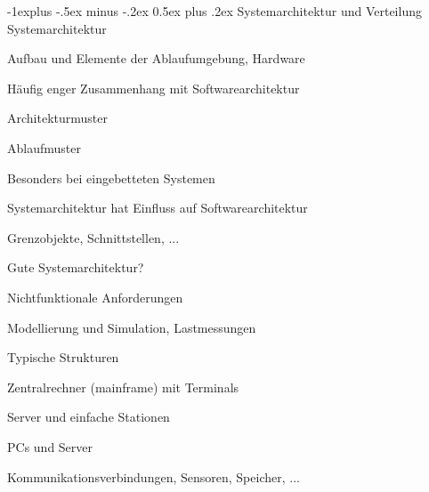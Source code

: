 \documentclass[a4paper]{article}
\makeatletter
\renewcommand{\subsection}{\@startsection{subsection}{2}{0mm}%
                                {-1explus -.5ex minus -.2ex}%
                                {0.5ex plus .2ex}%
                                {\normalfont\normalsize\bfseries}}
\makeatother
\begin{document}
\begin{multicols}{3}
  \subsection{Systemarchitektur und Verteilung}
  Systemarchitektur
  \begin{itemize*}
    \item Aufbau und Elemente der Ablaufumgebung, Hardware
    \item Häufig enger Zusammenhang mit Softwarearchitektur
          \begin{itemize*}
            \item Architekturmuster
            \item Ablaufmuster
          \end{itemize*}
    \item Besonders bei eingebetteten Systemen
    \item Systemarchitektur hat Einfluss auf Softwarearchitektur
          \begin{itemize*}
            \item Grenzobjekte, Schnittstellen, ...
          \end{itemize*}
    \item Gute Systemarchitektur?
          \begin{itemize*}
            \item Nichtfunktionale Anforderungen
            \item Modellierung und Simulation, Lastmessungen
          \end{itemize*}
  \end{itemize*}

  Typische Strukturen
  \begin{itemize*}
    \item Zentralrechner (mainframe) mit Terminals
    \item Server und einfache Stationen
    \item PCs und Server
    \item Kommunikationsverbindungen, Sensoren, Speicher, ...
  \end{itemize*}



\end{multicols}
\end{document}
